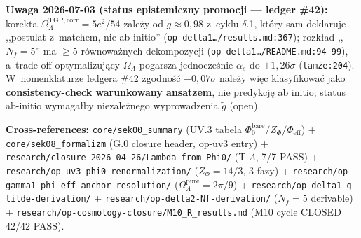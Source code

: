 \begin{remark}
\medskip\noindent
\textbf{Uwaga 2026-07-03 (status epistemiczny promocji --- ledger \#42):}
korekta $\Omega_\Lambda^{\mathrm{TGP,corr}} = 5e^2/54$ zale\.zy od
$\tilde{g} \approx 0{,}98$ z~cyklu $\delta$.1, kt\'ory sam deklaruje
,,postulat z~matchem, nie ab initio''
(\texttt{op-delta1\ldots/results.md:367}); rozk\l{}ad ,,$N_f=5$'' ma
$\geq 5$ r\'ownowa\.znych dekompozycji
(\texttt{op-delta1\ldots/README.md:94--99}), a~trade-off optymalizuj\k{a}cy
$\Omega_\Lambda$ pogarsza jednocze\'snie $\alpha_s$ do $+1{,}26\sigma$
(\texttt{tam\.ze:204}). W~nomenklaturze ledgera \#42 zgodno\'s\'c
$-0{,}07\sigma$ nale\.zy wi\k{e}c klasyfikowa\'c jako
\textbf{consistency-check warunkowany ansatzem}, nie predykcj\k{e}
ab initio; status ab-initio wymaga\l{}by niezale\.znego wyprowadzenia
$\tilde{g}$ (open).

\textbf{Cross-references:}
\texttt{core/sek00\_summary} (UV.3 tabela $\Phi_0^{\mathrm{bare}}/Z_\Phi/\Phi_{\mathrm{eff}}$) +
\texttt{core/sek08\_formalizm} (G.0 closure header, op-uv3 entry) +
\texttt{research/closure\_2026-04-26/Lambda\_from\_Phi0/} (T-$\Lambda$, 7/7 PASS) +
\texttt{research/op-uv3-phi0-renormalization/} ($Z_\Phi=14/3$, 3 fazy) +
\texttt{research/op-gamma1-phi-eff-anchor-resolution/} ($\Omega_\Lambda^{\mathrm{pure}}=2\pi/9$) +
\texttt{research/op-delta1-g-tilde-derivation/} +
\texttt{research/op-delta2-Nf-derivation/} ($N_f=5$ derivable) +
\texttt{research/op-cosmology-closure/M10\_R\_results.md} (M10 cycle CLOSED 42/42 PASS).
\end{remark}

